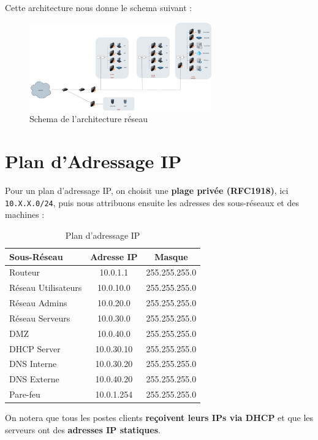 \documentclass[../Livrable1.tex]{subfiles}
\begin{document}
Cette architecture nous donne le schema suivant : 
\begin{figure}[h]
    \centering
    \includegraphics[width=0.7\textwidth]{../images/Architecture.jpg}
    \caption{Schema de l'architecture réseau}
    \label{fig:architecture}
\end{figure}

\section*{Plan d’Adressage IP}

Pour un plan d’adressage IP, on choisit une \textbf{plage privée (RFC1918)}, ici \texttt{10.X.X.0/24}, puis nous attribuons ensuite les adresses des sous-réseaux et des machines :

\begin{table}[h]
    \centering
    \begin{tabular}{|l|c|c|}
        \hline
        \textbf{Sous-Réseau} & \textbf{Adresse IP} & \textbf{Masque} \\
        \hline
        Routeur & 10.0.1.1 & 255.255.255.0 \\
        Réseau Utilisateurs & 10.0.10.0 & 255.255.255.0 \\
        Réseau Admins & 10.0.20.0 & 255.255.255.0 \\
        Réseau Serveurs & 10.0.30.0 & 255.255.255.0 \\
        DMZ & 10.0.40.0 & 255.255.255.0 \\
        DHCP Server & 10.0.30.10 & 255.255.255.0 \\
        DNS Interne & 10.0.30.20 & 255.255.255.0 \\
        DNS Externe & 10.0.40.20 & 255.255.255.0 \\
        Pare-feu & 10.0.1.254 & 255.255.255.0 \\
        \hline
    \end{tabular}
    \caption{Plan d’adressage IP}
\end{table}

On notera que tous les postes clients \textbf{reçoivent leurs IPs via DHCP} et que les serveurs ont des \textbf{adresses IP statiques}.
\end{document}
